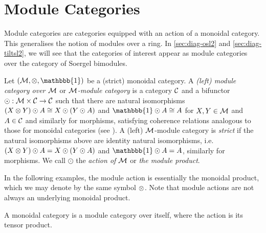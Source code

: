 \section{Module Categories}
\label{sec:module-cat}

Module categories are categories equipped with an action of a monoidal category. This generalises the notion of modules over a ring. In \autoref{sec:diag-osl2} and \autoref{sec:diag-tiltsl2}, we will see that the categories of interest appear as module categories over the category of Soergel bimodules.

\begin{definition}
    Let $(\mcal{M}, \tensor, \mathbbb{1})$ be a (strict) monoidal category. A \textit{(left) module category over $\mathcal{M}$} or \textit{$\mathcal{M}$-module category} is a category $\mathcal{C}$ and a bifunctor $\odot: \mathcal{M} \times \mathcal{C} \to \mathcal{C}$ such that there are natural isomorphisms $(X \otimes Y) \odot A \cong X \odot (Y \odot A)$ and $\mathbbb{1} \odot A \cong A$ for $X,Y \in \mathcal{M}$ and $A \in \mathcal{C}$ and similarly for morphisms, satisfying coherence relations analogous to those for monoidal categories (see \cite[Definition 7.1.2]{tensor-categories}). A (left) $\mathcal{M}$-module category is \textit{strict} if the natural isomorphisms above are identity natural isomorphisms, i.e. $(X \otimes Y) \odot A = X \odot (Y \odot A)$ and $\mathbbb{1} \odot A = A$, similarly for morphisms. We call $\odot$ the \textit{action of $\mathcal{M}$} or \textit{the module product}. 
\end{definition}

In the following examples, the module action is essentially the monoidal product, which we may denote by the same symbol $\otimes$. Note that module actions are not always an underlying monoidal product.

\begin{example}
    A monoidal category is a module category over itself, where the action is its tensor product.
\end{example}

